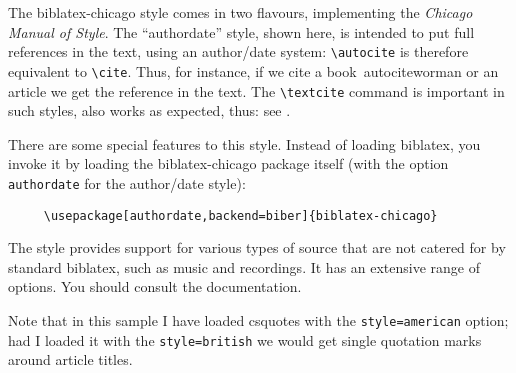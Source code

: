 
\usepackage[style=american]{csquotes}
\usepackage[american]{babel}
\usepackage[authordate,backend=biber]{biblatex-chicago}

\renewcommand{\showingstyle}{Chicago Author/Date}

%
\noindent The \textsf{biblatex-chicago} style comes in two flavours, implementing the \emph{Chicago Manual of Style}. The \enquote{authordate} style, shown here, is intended to put full references in the text, using an author/date system: \verb|\autocite| is therefore equivalent to \verb|\cite|. Thus, for instance, if we cite a book\ autocite{worman} or an article \autocite{reese} we get the reference in the text. The \verb|\textcite| command is important in such styles, also works as expected, thus: see \textcite{worman}.

\quad There are some special features to this style. Instead of loading \textsf{biblatex}, you invoke it by loading the \textsf{biblatex-chicago} package itself (with the option \verb|authordate| for the author/date style):
\begin{verbatim}
     \usepackage[authordate,backend=biber]{biblatex-chicago}
\end{verbatim}
The style provides support for various types of source that are not catered for by standard \textsf{biblatex}, such as music and recordings. It has an extensive range of options. You should consult the documentation.

Note that in this sample I have loaded \textsf{csquotes} with the \verb~style=american~ option; had I loaded it with the \verb~style=british~ we would get single quotation marks around article titles.





